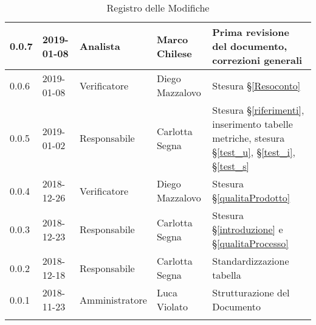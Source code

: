 \begin{center}
\begin{longtable}[c]{|m{}|m{}|m{}|m{}|p{}|}
\hline
0.0.7 & 2019-01-08 & Analista & Marco Chilese & Prima revisione del documento, correzioni generali\\
\hline
\rowcolor{grigio}0.0.6 & 2019-01-08 & Verificatore & Diego Mazzalovo & Stesura §\ref{Resoconto}\\
\hline
0.0.5 & 2019-01-02 & Responsabile & Carlotta Segna & Stesura §\ref{riferimenti}, inserimento tabelle metriche, stesura §\ref{test_u}, §\ref{test_i}, §\ref{test_s} \\
\hline
\rowcolor{grigio} 0.0.4 & 2018-12-26 & Verificatore & Diego Mazzalovo  & Stesura §\ref{qualitaProdotto} \\
\hline
0.0.3 & 2018-12-23 & Responsabile  & Carlotta Segna & Stesura §\ref{introduzione} e §\ref{qualitaProcesso} \\
\hline
\rowcolor{grigio} 0.0.2 & 2018-12-18 & Responsabile & Carlotta Segna & Standardizzazione tabella \\
\hline
0.0.1 & 2018-11-23 & Amministratore & Luca Violato & Strutturazione del Documento \\

\hline
\caption{Registro delle Modifiche}
\end{longtable}
\end{center}
